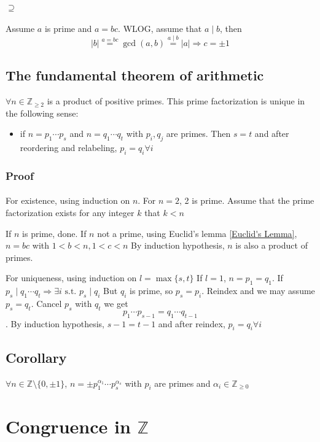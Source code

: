 \documentclass{book}
\newcommand{\abs}[1]{\left\lvert #1 \right\rvert}
\begin{document}
\subsubsection{$\supseteq$}
Assume $a$ is prime and $a=bc$. WLOG, assume that $a\mid b$, then $$\abs{b}\stackrel{a=bc}{=}\gcd(a,b)\stackrel{a\mid b}{=}\abs{a} \Rightarrow c=\pm 1$$
\section{The fundamental theorem of arithmetic}
$\forall n\in \mathbb{Z}_{\geq 2}$ is a product of positive primes. This prime factorization is unique in the following sense:
\begin{itemize}
	\item if $n=p_1\cdots p_s$ and $n=q_1\cdots q_t$ with $p_i,q_j$ are primes. Then $s=t$ and after reordering and relabeling, $p_i=q_i\forall i$
\end{itemize}
\subsection*{Proof}
\subsubsection{}
For existence, using induction on $n$. For $n=2$, 2 is prime. Assume that the prime factorization exists for any integer $k$ that $k<n$

If $n$ is prime, done. If $n$ not a prime, using Euclid's lemma \ref{Euclid's Lemma}, $n=bc$ with $1<b<n,1<c<n$ By induction hypothesis, $n$ is also a product of primes.

For uniqueness, using induction on $l=\max\{s,t\}$ If $l=1$, $n=p_1=q_1$. If $p_s\mid q_1\cdots q_t\Rightarrow \exists i\text{ s.t. }p_s\mid q_i$ But $q_i$ is prime, so $p_s=p_i$. Reindex and we may assume $p_s=q_t$. Cancel $p_s$ with $q_t$ we get $$p_1\cdots p_{s-1}=q_1\cdots q_{t-1}$$. By induction hypothesis, $s-1=t-1$ and after reindex, $p_i=q_i\forall i$
\section{Corollary}
$\forall n\in \mathbb{Z}\setminus\{0,\pm 1\}$, $n=\pm p_1^{\alpha_1}\cdots p_s^{\alpha_s}$ with $p_i$ are primes and $\alpha_i\in \mathbb{Z}_{\geq 0}$
\chapter{Congruence in $\mathbb{Z}$}
\end{document}
